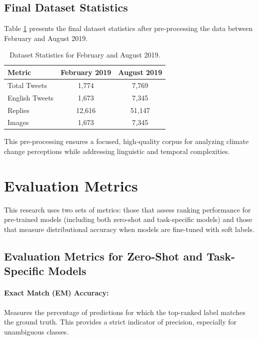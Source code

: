 \subsection{Final Dataset Statistics}

Table \ref{tab:dataset_stats} presents the final dataset statistics after pre-processing the data between February and August 2019.

\begin{table}[h!]
\centering
\begin{tabular}{lcc}
\toprule
Metric                & February 2019 & August 2019 \\
\midrule
Total Tweets          & 1,774          & 7,769      \\
English Tweets        & 1,673         & 7,345      \\
Replies               & 12,616        & 51,147     \\
Images                & 1,673         & 7,345      \\
\bottomrule
\end{tabular}
\caption{Dataset Statistics for February and August 2019.}
\label{tab:dataset_stats}
\end{table}

\noindent
This pre-processing ensures a focused, high-quality corpus for analyzing climate change perceptions while addressing linguistic and temporal complexities.

\section{Evaluation Metrics}

This research uses two sets of metrics: those that assess ranking performance for pre-trained models (including both zero-shot and task-specific models) and those that measure distributional accuracy when models are fine-tuned with soft labels. 

\subsection{Evaluation Metrics for Zero-Shot and Task-Specific Models}
\label{subsec:pretrained-metrics}

\paragraph{Exact Match (EM) Accuracy:}  
Measures the percentage of predictions for which the top-ranked label matches the ground truth. This provides a strict indicator of precision, especially for unambiguous classes.

